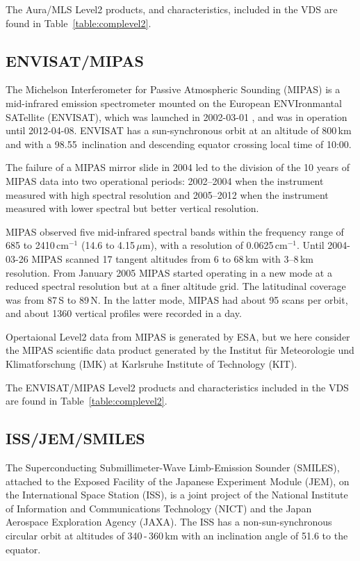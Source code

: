 The Aura/MLS Level2 products, and characteristics, included in the
VDS are found in Table~\ref{table:complevel2}.


\subsection{ENVISAT/MIPAS}

The Michelson Interferometer for Passive Atmospheric
Sounding (MIPAS) is a mid-infrared emission spectrometer
mounted on the European ENVIronmantal SATellite (ENVISAT),
which was launched in 2002-03-01 \citep{fischer2008},
and was in operation until 2012-04-08. 
ENVISAT has a sun-synchronous orbit at an altitude of 800\,km
and with a 98.55\degree\ inclination and descending equator 
crossing local time of 10:00.

The failure of a MIPAS mirror slide in 2004 led to the 
division of the 10 years of MIPAS
data into two operational periods: 2002--2004 when the 
instrument measured with high spectral resolution 
and 2005--2012 when the instrument measured with lower 
spectral but better vertical resolution.

MIPAS observed five mid-infrared spectral bands within the
frequency range of 685 to 2410\,cm\(^{-1}\) (14.6 to 4.15\,\(\mu\)m),
with a resolution of 0.0625\,cm\(^{-1}\).
Until 2004-03-26 MIPAS scanned 17 tangent altitudes from 
6 to 68\,km with 3--8\,km resolution.
From January 2005 MIPAS started operating in a new mode
at a reduced spectral resolution but at a finer altitude
grid. The latitudinal coverage was from 87\degree\,S to 89\degree\,N.
In the latter mode, MIPAS had about 95 scans per orbit, and about
1360 vertical profiles were recorded in a day.

Opertaional Level2 data from MIPAS is generated by ESA,
but we here consider the MIPAS scientific data product
generated by the Institut f\"ur Meteorologie und Klimatforschung
(IMK) at Karlsruhe Institute of Technology (KIT).

The  ENVISAT/MIPAS Level2 products and characteristics included in the
VDS are found in Table~\ref{table:complevel2}.


\subsection{ISS/JEM/SMILES}

The Superconducting Submillimeter-Wave Limb-Emission Sounder (SMILES),
attached to the Exposed Facility of the Japanese Experiment Module (JEM), 
on the International Space Station (ISS), is a joint project of the
National Institute of Information and Communications Technology (NICT) and
the Japan Aerospace Exploration Agency (JAXA).
The ISS has a non-sun-synchronous circular orbit at
altitudes of 340\,-\,360\,km with an inclination angle of 51.6\degree
to the equator. 

